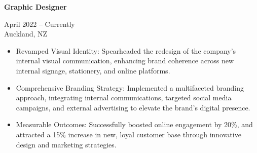 \documentclass[10pt,a4paper,ragged2e,withhyper]{altacv}
\renewcommand{\cvevent}[4]{%
  \textbf{#1} %
  \hfill %
  \begin{minipage}[t]{.5\linewidth}
    \raggedleft %
    \small#3 %
    \\ %
    #4 %
  \end{minipage}
  \vspace{\baselineskip} %
}
\begin{document}
\vspace{0.5cm}


\begin{paracol}{2}
  \divider
  \divider
  \divider
  \divider
  \divider
  \divider

  
  \switchcolumn
  \divider
  \divider
  \divider
  \divider
  \divider

  \divider
\end{paracol}

\vspace{0.5cm}

\makeatletter
\makeatother


\cvevent{Graphic Designer}{Bonita Brazilian Beauty}{April 2022 -- Currently}{Auckland, NZ}
\begin{itemize}
  \item Revamped Visual Identity: Spearheaded the redesign of the company's internal visual communication, enhancing brand coherence across new internal signage, stationery, and online platforms.
  \item Comprehensive Branding Strategy: Implemented a multifaceted branding approach, integrating internal communications, targeted social media campaigns, and external advertising to elevate the brand's digital presence.
  \item Measurable Outcomes: Successfully boosted online engagement by 20\%, and attracted a 15\% increase in new, loyal customer base through innovative design and marketing strategies.
\end{itemize}
\end{document}
